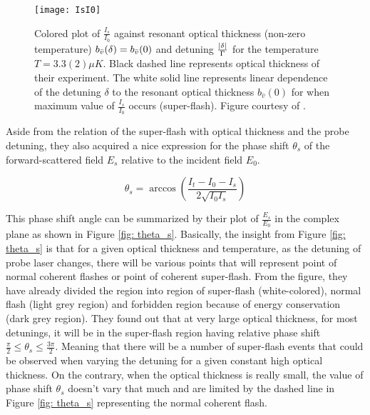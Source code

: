 \newpage

\begin{figure}[h!]
    \centering
    \texttt{[image: IsI0]}
    \caption{Colored plot of $\frac{I_{s}}{I_{0}}$  against resonant optical thickness (non-zero temperature) $b_{\bar{v}}(\delta) = b_{\Bar{v}}(0)$ and detuning $\frac{\abs{\delta}}{\Gamma}$ for the temperature $T = 3.3(2) \mu K$. Black dashed line represents optical thickness of their experiment. The white solid line represents linear dependence of the detuning $\delta$ to the resonant optical thickness $b_{\bar{v}}(0)$ for when maximum value of $\frac{I_{s}}{I_{0}}$ occurs (super-flash). Figure courtesy of \cite{Kwong2014}.}
    \label{fig: I_s/I_0}
\end{figure}

Aside from the relation of the super-flash with optical thickness and the probe detuning, they also acquired a nice expression for the phase shift $\theta_{s}$ of the forward-scattered field $E_{s}$ relative to the incident field $E_{0}$. 

\begin{equation}
    \theta_{s} = \arccos({\frac{I_{t} - I_{0} - I_{s}}{2 \sqrt{I_{0} I_{s}}}})
\end{equation}

This phase shift angle can be summarized by their plot of $\frac{E_{s}}{E_{0}}$ in the complex plane as shown in Figure \ref{fig: theta_s}. Basically, the insight from Figure \ref{fig: theta_s} is that for a given optical thickness and temperature, as the detuning of probe laser changes, there will be various points that will represent point of normal coherent flashes or point of coherent super-flash. From the figure, they have already divided the region into region of super-flash (white-colored), normal flash (light grey region) and forbidden region because of energy conservation (dark grey region). They found out that at very large optical thickness, for most detunings, it will be in the super-flash region having relative phase shift $\frac{\pi}{2} \leq \theta_{s} \leq \frac{3\pi}{2}$. Meaning that there will be a number of super-flash events that could be observed when varying the detuning for a given constant high optical thickness. On the contrary, when the optical thickness is really small, the value of phase shift $\theta_{s}$ doesn't vary that much and are limited by the dashed line in Figure \ref{fig: theta_s} representing the normal coherent flash.

